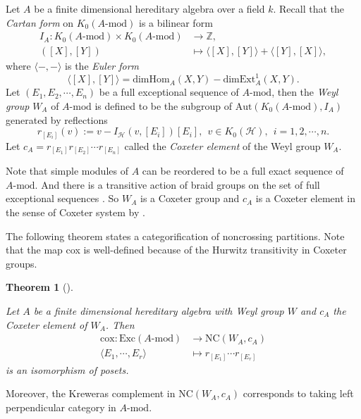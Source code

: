 \documentclass[a4paper, 11pt, reqno]{amsart}
\numberwithin{equation}{section}
\newtheorem{thm}{Theorem}[section]
\theoremstyle{remark}
\theoremstyle{definition}
\begin{document}
Let $A$ be a finite dimensional hereditary algebra over a field $k$. Recall that the \emph{Cartan form} on $K_0(A \text{-mod})$ is a bilinear form
\begin{align*}
   I_{A}:K_0(A \text{-mod}) \times K_0(A \text{-mod}) &\to \mathbb Z, \\
   ([X],[Y]) &\mapsto \langle [X],[Y] \rangle + \langle [Y],[X] \rangle,
\end{align*}
where $\langle -,- \rangle$ is the \emph{Euler form} 
\[
   \langle [X],[Y] \rangle=\mathrm{dimHom}_{A}(X,Y)-\mathrm{dimExt}_{A}^1 (X,Y).
\]
Let $(E_1,E_2, \cdots, E_n)$ be a full exceptional sequence of $A\text{-mod}$, then the \emph{Weyl group} $W_A$ of $A \text{-mod}$ is defined to be the subgroup of $\mathrm{Aut}(K_0(A \text{-mod}), I_{A})$ generated by reflections
\[
   r_{[E_i]}(v):=v-I_{\mathcal H}(v,[E_i])[E_i], \ \ v\in K_0(\mathcal H), \ \ i=1,2,\cdots,n.
\]
Let $c_A=r_{[E_1]} r_{[E_2]} \cdots r_{[E_n]}$ called the \emph{Coxeter element} of the Weyl group $W_A$.

Note that simple modules of $A$ can be reordered to be a full exact sequence of $A \text{-mod}$. And there is a transitive action of braid groups on the set of full exceptional sequences \cite[Theorem]{crawley1993exceptional}. So $W_A$ is a Coxeter group and $c_A$ is a Coxeter element in the sense of Coxeter system by \cite[Proposition 3.13]{kac1990infinite}. 

The following theorem states a categorification of noncrossing partitions. Note that the map cox is well-defined because of the Hurwitz transitivity in Coxeter groups.

\begin{thm} [{\cite[Theorem 3.13, Theorem 3.16]{ingalls2009noncrossing}}{\cite[Theorem~1.2]{hubery2016categorification}}] \label{hubery_krause}

   Let $A$ be a finite dimensional hereditary algebra with Weyl group $W$ and $c_A$ the Coxeter element of $W_A$. Then
   \begin{align*}
      \mathrm{cox}: \mathrm{Exc}(A \text{-} \mathrm{mod}) &\to \mathrm{NC}(W_A,c_A) \\
      \langle E_1,\cdots, E_r \rangle &\mapsto r_{[E_1]} \cdots r_{[E_r]}
   \end{align*}
   is an isomorphism of posets.
\end{thm}

Moreover, the Kreweras complement in $\mathrm{NC}(W_A,c_A)$ corresponds to taking left perpendicular category in $A \text{-mod}$.
\end{document}
